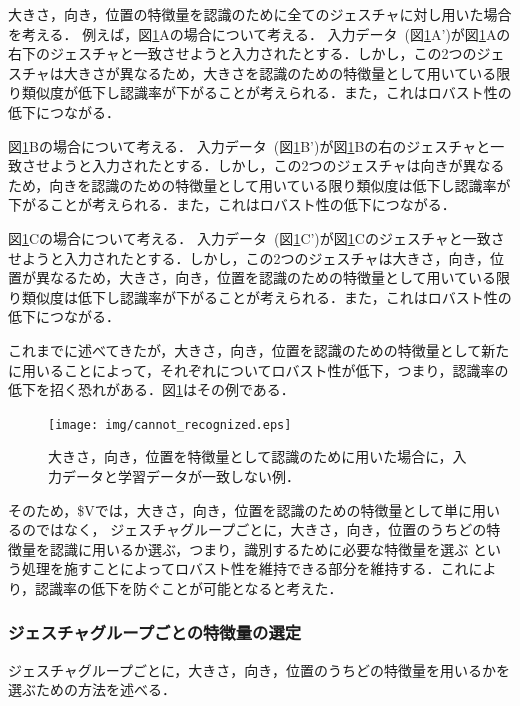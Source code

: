 大きさ，向き，位置の特徴量を認識のために全てのジェスチャに対し用いた場合を考える．
例えば，図\ref{fig:cannot_recognized}Aの場合について考える．
入力データ~(図\ref{fig:cannot_recognized}A')が図\ref{fig:cannot_recognized}Aの右下のジェスチャと一致させようと入力されたとする．しかし，この2つのジェスチャは大きさが異なるため，大きさを認識のための特徴量として用いている限り類似度が低下し認識率が下がることが考えられる．また，これはロバスト性の低下につながる．

図\ref{fig:cannot_recognized}Bの場合について考える．
入力データ~(図\ref{fig:cannot_recognized}B')が図\ref{fig:cannot_recognized}Bの右のジェスチャと一致させようと入力されたとする．しかし，この2つのジェスチャは向きが異なるため，向きを認識のための特徴量として用いている限り類似度は低下し認識率が下がることが考えられる．また，これはロバスト性の低下につながる．

図\ref{fig:cannot_recognized}Cの場合について考える．
入力データ~(図\ref{fig:cannot_recognized}C')が図\ref{fig:cannot_recognized}Cのジェスチャと一致させようと入力されたとする．しかし，この2つのジェスチャは大きさ，向き，位置が異なるため，大きさ，向き，位置を認識のための特徴量として用いている限り類似度は低下し認識率が下がることが考えられる．また，これはロバスト性の低下につながる．

これまでに述べてきたが，大きさ，向き，位置を認識のための特徴量として新たに用いることによって，それぞれについてロバスト性が低下，つまり，認識率の低下を招く恐れがある．図\ref{fig:cannot_recognized}はその例である．

\begin{figure} [h!]
	\begin{center}
		\texttt{[image: img/cannot\_recognized.eps]}
	\end{center}
	\caption{大きさ，向き，位置を特徴量として認識のために用いた場合に，入力データと学習データが一致しない例．}
	\label{fig:cannot_recognized}
\end{figure}

そのため，\$Vでは，大きさ，向き，位置を認識のための特徴量として単に用いるのではなく，
ジェスチャグループごとに，大きさ，向き，位置のうちどの特徴量を認識に用いるか選ぶ，つまり，識別するために必要な特徴量を選ぶ
という処理を施すことによってロバスト性を維持できる部分を維持する．これにより，認識率の低下を防ぐことが可能となると考えた．

\subsubsection{ジェスチャグループごとの特徴量の選定}
ジェスチャグループごとに，大きさ，向き，位置のうちどの特徴量を用いるかを選ぶための方法を述べる．


